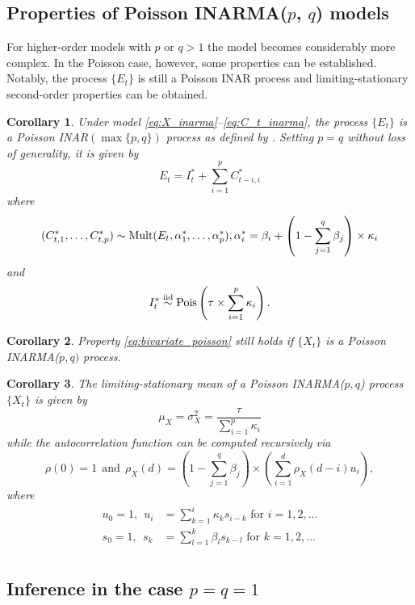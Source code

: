 \documentclass{article}
\newtheorem{corollary}{Corollary}
\begin{document}
\subsection{Properties of Poisson INARMA($p$, $q$) models}

For higher-order models with $p$ or $q > 1$ the model becomes considerably more complex. In the Poisson case, however, some properties can be established. Notably, the process $\{E_t\}$ is still a Poisson INAR process and limiting-stationary second-order properties can be obtained.

\begin{corollary}
Under model \eqref{eq:X_inarma}--\eqref{eq:C_t_inarma}, the process $\{E_t\}$ is a Poisson INAR$(\max\{p, q\})$ process as defined by \cite{Alzaid1990}. Setting $p = q$ without loss of generality, it is given by
$$
E_t = I^*_t + \sum_{i = 1}^p C^*_{t - i, i}
$$
where
$$
(C^*_{t, 1}, \dots, C^*_{t, p}) \sim \textnormal{Mult}(E_t, \alpha^*_1, \dots, \alpha^*_p), \alpha^*_i = \beta_i + \left(1 - \sum_{j = 1}^q \beta_j\right) \times \kappa_i
$$
and
$$
I^*_t \stackrel{\textnormal{iid}}{\sim} \textnormal{Pois}\left(\tau \times \sum_{i = 1}^p \kappa_i\right).
$$
\end{corollary}

\begin{corollary}
Property \eqref{eq:bivariate_poisson} still holds if $\{X_t\}$ is a Poisson INARMA($p, q)$ process.
\end{corollary}

\begin{corollary}
The limiting-stationary mean of a Poisson INARMA($p, q$) process $\{X_t\}$ is given by
$$
\mu_X = \sigma^2_X = \frac{\tau}{\sum_{i = 1}^p \kappa_i}
$$
while the autocorrelation function can be computed recursively via
$$
\rho(0) = 1 \ \ \text{and} \ \ \rho_X(d) = \left(1 - \sum_{j = 1}^q \beta_j\right) \times \left(\sum_{i = 1}^d \rho_X(d - i) u_i\right),
$$
where
\begin{align*}
u_0 = 1, \ \ u_i & = \sum_{k = 1}^{i} \kappa_k s_{i - k} \text{ for } i = 1, 2, \dots \\
s_0 = 1, \ \ s_k & = \sum_{l = 1}^k \beta_l s_{k - l} \text{ for } k = 1, 2, \dots \\
\end{align*}
\end{corollary}


\subsection{Inference in the case $p = q = 1$}
\end{document}

